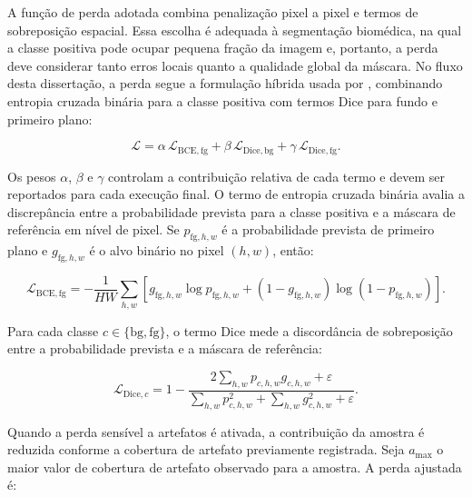 A função de perda adotada combina penalização pixel a pixel e termos de
sobreposição espacial. Essa escolha é adequada à segmentação biomédica, na qual
a classe positiva pode ocupar pequena fração da imagem e, portanto, a perda deve
considerar tanto erros locais quanto a qualidade global da máscara. No fluxo
desta dissertação, a perda segue a formulação híbrida usada por
\textcite{khened2021generalized}, combinando entropia cruzada binária para a
classe positiva com termos Dice para fundo e primeiro plano:

\begin{equation}
    \mathcal{L} =
    \alpha\,\mathcal{L}_{\mathrm{BCE},\mathrm{fg}}
    + \beta\,\mathcal{L}_{\mathrm{Dice},\mathrm{bg}}
    + \gamma\,\mathcal{L}_{\mathrm{Dice},\mathrm{fg}}.
    \label{eq:perda_treinamento}
\end{equation}

Os pesos $\alpha$, $\beta$ e $\gamma$ controlam a contribuição relativa de cada
termo e devem ser reportados para cada execução final. O termo de entropia
cruzada binária avalia a discrepância entre a probabilidade prevista para a
classe positiva e a máscara de referência em nível de pixel. Se
$p_{\mathrm{fg},h,w}$ é a probabilidade prevista de primeiro plano e
$g_{\mathrm{fg},h,w}$ é o alvo binário no pixel $(h,w)$, então:

\begin{equation}
    \mathcal{L}_{\mathrm{BCE},\mathrm{fg}} =
    -\frac{1}{HW}
    \sum_{h,w}
    \left[
    g_{\mathrm{fg},h,w}\log p_{\mathrm{fg},h,w}
    +
    (1-g_{\mathrm{fg},h,w})\log(1-p_{\mathrm{fg},h,w})
    \right] .
    \label{eq:bce_fg}
\end{equation}

Para cada classe $c \in \{\mathrm{bg},\mathrm{fg}\}$, o termo Dice mede a
discordância de sobreposição entre a probabilidade prevista e a máscara de
referência:

\begin{equation}
    \mathcal{L}_{\mathrm{Dice},c} =
    1 -
    \frac{
    2\sum_{h,w}p_{c,h,w}g_{c,h,w}+\varepsilon
    }{
    \sum_{h,w}p_{c,h,w}^2+\sum_{h,w}g_{c,h,w}^2+\varepsilon
    } .
    \label{eq:dice_loss}
\end{equation}

Quando a perda sensível a artefatos é ativada, a contribuição da amostra é
reduzida conforme a cobertura de artefato previamente registrada. Seja
$a_{\max}$ o maior valor de cobertura de artefato observado para a amostra. A
perda ajustada é:

